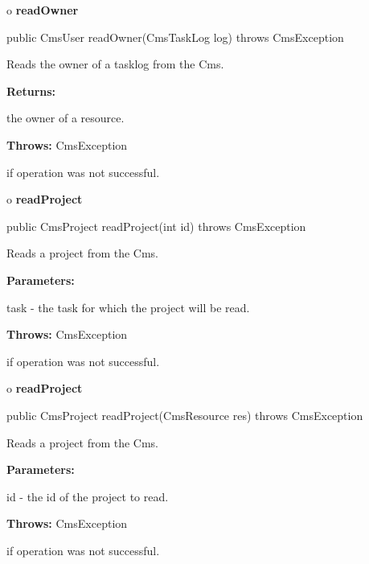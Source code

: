 o {\bf readOwner} 

\begin{PRE}
 public CmsUser readOwner(CmsTaskLog log) throws CmsException
\end{PRE}

\begin{description}
\htmlDD Reads the owner of a tasklog from the Cms. 

\begin{description}
\item {\bf Returns:}  

the owner of a resource.  
\item {\bf Throws:} CmsException  

if operation was not successful.  
\end{description}

\end{description}

o {\bf readProject} 

\begin{PRE}
 public CmsProject readProject(int id) throws CmsException
\end{PRE}

\begin{description}
\htmlDD Reads a project from the Cms. 

\begin{description}
\item {\bf Parameters:}  

task - the task for which the project will be read.  
\item {\bf Throws:} CmsException  

if operation was not successful.  
\end{description}

\end{description}

o {\bf readProject} 

\begin{PRE}
 public CmsProject readProject(CmsResource res) throws CmsException
\end{PRE}

\begin{description}
\htmlDD Reads a project from the Cms. 

\begin{description}
\item {\bf Parameters:}  

id - the id of the project to read.  
\item {\bf Throws:} CmsException  

if operation was not successful.  
\end{description}

\end{description}

